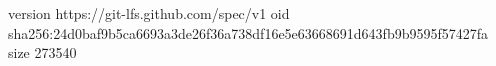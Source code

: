version https://git-lfs.github.com/spec/v1
oid sha256:24d0baf9b5ca6693a3de26f36a738df16e5e63668691d643fb9b9595f57427fa
size 273540
